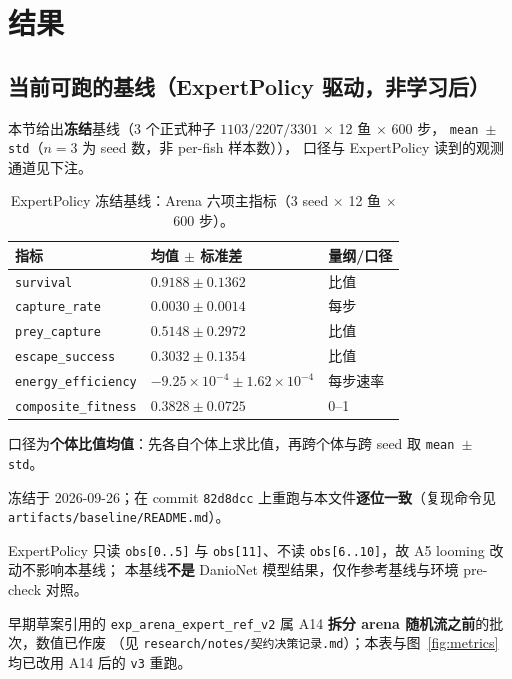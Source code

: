\section{结果}\label{sec:results}


\subsection{当前可跑的基线（ExpertPolicy 驱动，非学习后）}
本节给出\textbf{冻结}基线（3 个正式种子 $1103/2207/3301$ $\times$ 12 鱼 $\times$ 600 步，
\texttt{mean $\pm$ std}（$n=3$ 为 seed 数，非 per-fish 样本数）），
口径与 ExpertPolicy 读到的观测通道见下注。

\begin{table}[H]
  \centering
  \caption{ExpertPolicy 冻结基线：Arena 六项主指标（3 seed $\times$ 12 鱼 $\times$ 600 步）。}
  \label{tab:baseline}
  \small
  \begin{threeparttable}
  \begin{tabular}{lll}
    \toprule
    指标 & 均值 $\pm$ 标准差 & 量纲/口径 \\
    \midrule
    \texttt{survival}           & $0.9188 \pm 0.1362$ & 比值 \\
    \texttt{capture\_rate}      & $0.0030 \pm 0.0014$ & 每步 \\
    \texttt{prey\_capture}      & $0.5148 \pm 0.2972$ & 比值 \\
    \texttt{escape\_success}    & $0.3032 \pm 0.1354$ & 比值 \\
    \texttt{energy\_efficiency} & $-9.25\times10^{-4} \pm 1.62\times10^{-4}$ & 每步速率 \\
    \texttt{composite\_fitness} & $0.3828 \pm 0.0725$ & 0--1 \\
    \bottomrule
  \end{tabular}
  \begin{tablenotes}\footnotesize
    \item 口径为\textbf{个体比值均值}：先各自个体上求比值，再跨个体与跨 seed 取 \texttt{mean $\pm$ std}。
    \item 冻结于 2026-09-26；在 commit \texttt{82d8dcc} 上重跑与本文件\textbf{逐位一致}（复现命令见 \texttt{artifacts/baseline/README.md}）。
    \item ExpertPolicy 只读 \texttt{obs[0..5]} 与 \texttt{obs[11]}、不读 \texttt{obs[6..10]}，故 A5 looming 改动不影响本基线；
    本基线\textbf{不是} DanioNet 模型结果，仅作参考基线与环境 pre-check 对照。
    \item 早期草案引用的 \texttt{exp\_arena\_expert\_ref\_v2} 属 A14 \textbf{拆分 arena 随机流之前}的批次，数值已作废
    （见 \texttt{research/notes/契约决策记录.md}）；本表与图~\ref{fig:metrics} 均已改用 A14 后的 \texttt{v3} 重跑。
  \end{tablenotes}
  \end{threeparttable}
\end{table}


